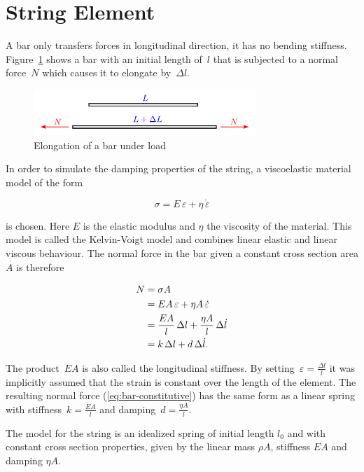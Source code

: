 \newpage
\section{String Element}

A bar only transfers forces in longitudinal direction, it has no bending stiffness. Figure~\ref{fig:bar-element-1} shows a bar with an initial length of~$l$ that is subjected to a normal force~$N$ which causes it to elongate by~$\Delta l$.

\begin{figure}[h]
\centering
\includegraphics[width=0.75\textwidth]{figures/elements/bar-element-1}
\caption{Elongation of a bar under load}
\label{fig:bar-element-1}
\end{figure}

In order to simulate the damping properties of the string, a viscoelastic material model of the form

\begin{equation}
\sigma = E\,\varepsilon + \eta\,\dot{\varepsilon}
\end{equation}

is chosen. Here $E$ is the elastic modulus and $\eta$ the viscosity of the material. This model is called the Kelvin-Voigt model and combines linear elastic and linear viscous behaviour. The normal force in the bar given a constant cross section area $A$ is therefore

\begin{align}
N &= \sigma A \notag \\
&= EA\,\varepsilon + \eta A\,\dot{\varepsilon} \notag \\
&= \frac{EA}{l}\,\Delta l + \frac{\eta A}{l}\,\Delta \dot{l} \\
&= k\,\Delta l + d\,\Delta \dot{l}.\label{eq:bar-constitutive}
\end{align}

The product~$EA$ is also called the longitudinal stiffness.
By setting~$\varepsilon = \frac{\Delta l}{l}$ it was implicitly assumed that the strain is constant over the length of the element.
The resulting normal force (\ref{eq:bar-constitutive}) has the same form as a linear spring with stiffness~$k = \frac{EA}{l}$ and damping~$d = \frac{\eta A}{l}$.

The model for the string is an idealized spring of initial length $l_{0}$ and with constant cross section properties, given by the linear mass $\rho A$, stiffness $EA$ and damping $\eta A$.

